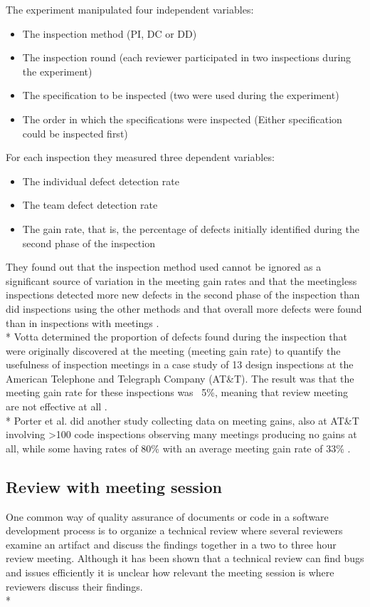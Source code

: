The experiment manipulated four independent variables:
\begin{itemize}
	\item The inspection method (PI, DC or DD)
	\item The inspection round (each reviewer participated in two inspections during the experiment)
	\item The specification to be inspected (two were used during the experiment)
	\item The order in which the specifications were inspected (Either specification could be inspected first)
\end{itemize}
For each inspection they measured three dependent variables:
\begin{itemize}
	\item The individual defect detection rate
	\item The team defect detection rate
	\item The gain rate, that is, the percentage of defects initially identified during the second phase of the inspection
\end{itemize}
They found out that the inspection method used cannot be ignored as a significant source of variation in the meeting gain rates and that the meetingless inspections detected more new defects in the second phase of the inspection than did inspections using the other methods and that overall more defects were found than in inspections with meetings \cite{mccarthy1996experiment}. \\*
Votta determined the proportion of defects found during the inspection that were originally discovered at the meeting (meeting gain rate) to quantify the usefulness of inspection meetings in a case study of 13 design inspections at the American Telephone and Telegraph Company (AT\&T). The result was that the meeting gain rate for these inspections was ~5\%, meaning that review meeting are not effective at all \cite{votta1993does}. \\*
Porter et al. did another study collecting data on meeting gains, also at AT\&T involving >100 code inspections observing many meetings producing no gains at all, while some having rates of 80\% with an average meeting gain rate of 33\% \cite{porter1995experiment}.

\subsection{Review with meeting session}
One common way of quality assurance of documents or code in a software development process is to organize a technical review where several reviewers examine an artifact and discuss the findings together in a two to three hour review meeting. Although it has been shown that a technical review can find bugs and issues efficiently it is unclear how relevant the meeting session is where reviewers discuss their findings. \\*

